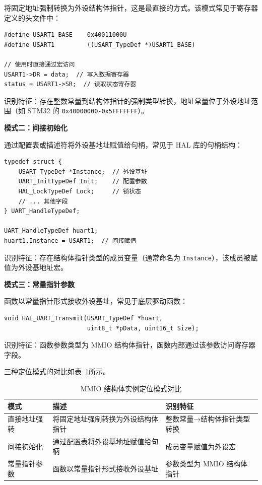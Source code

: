 将固定地址强制转换为外设结构体指针，这是最直接的方式。该模式常见于寄存器定义的头文件中：

\begin{lstlisting}[style=CStyle,abovecaptionskip=0pt,belowcaptionskip=0pt]
#define USART1_BASE    0x40011000U
#define USART1         ((USART_TypeDef *)USART1_BASE)

// 使用时直接通过宏访问
USART1->DR = data;  // 写入数据寄存器
status = USART1->SR;  // 读取状态寄存器
\end{lstlisting}

识别特征：存在整数常量到结构体指针的强制类型转换，地址常量位于外设地址范围（如 STM32 的 \texttt{0x40000000-0x5FFFFFFF}）。

\textbf{模式二：间接初始化}

通过配置表或描述符将外设基地址赋值给句柄，常见于 HAL 库的句柄结构：

\begin{lstlisting}[style=CStyle,abovecaptionskip=0pt,belowcaptionskip=0pt]
typedef struct {
    USART_TypeDef *Instance;  // 外设基址
    UART_InitTypeDef Init;    // 配置参数
    HAL_LockTypeDef Lock;     // 锁状态
    // ... 其他字段
} UART_HandleTypeDef;

UART_HandleTypeDef huart1;
huart1.Instance = USART1;  // 间接赋值
\end{lstlisting}

识别特征：存在结构体指针类型的成员变量（通常命名为 \texttt{Instance}），该成员被赋值为外设基地址宏。

\textbf{模式三：常量指针参数}

函数以常量指针形式接收外设基址，常见于底层驱动函数：

\begin{lstlisting}[style=CStyle,abovecaptionskip=0pt,belowcaptionskip=0pt]
void HAL_UART_Transmit(USART_TypeDef *huart,
                       uint8_t *pData, uint16_t Size);
\end{lstlisting}

识别特征：函数参数类型为 MMIO 结构体指针，函数内部通过该参数访问寄存器字段。

三种定位模式的对比如表~\ref{tab:mmio-patterns}所示。

\begin{table}[htbp]
\centering
\caption{MMIO 结构体实例定位模式对比}
\label{tab:mmio-patterns}
\begin{tabular}{lp{5cm}l}
\toprule
\textbf{模式} & \textbf{描述} & \textbf{识别特征} \\
\midrule
直接地址强转 & 将固定地址强制转换为外设结构体指针 & 整数常量→结构体指针类型转换 \\
间接初始化 & 通过配置表将外设基地址赋值给句柄 & 成员变量赋值为外设宏 \\
常量指针参数 & 函数以常量指针形式接收外设基址 & 参数类型为 MMIO 结构体指针 \\
\bottomrule
\end{tabular}
\end{table}

